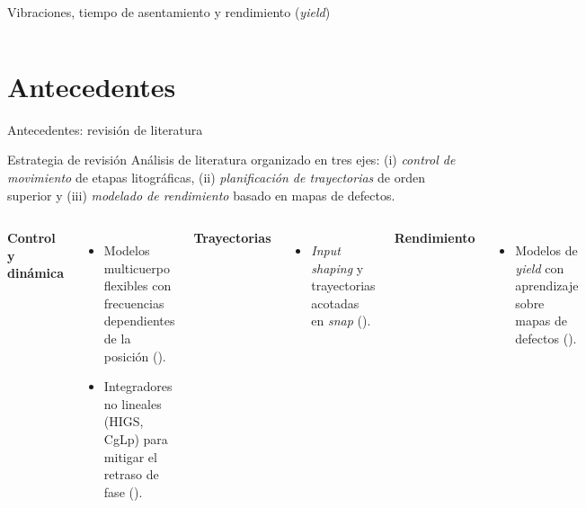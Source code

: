 \documentclass[en,16:9,navbarinline,bigfoot]{sdqbeamer}
\begin{document}
\begin{frame}{Vibraciones, tiempo de asentamiento y rendimiento (\textit{yield})}
\begin{columns}
    \end{columns}
\end{frame}

\section{Antecedentes}

\begin{frame}{Antecedentes: revisión de literatura}
    \begin{purpleblock}{Estrategia de revisión}
        Análisis de literatura organizado en tres ejes: (i) \emph{control de movimiento} de etapas litográficas, (ii) \emph{planificación de trayectorias} de orden superior y (iii) \emph{modelado de rendimiento} basado en mapas de defectos.
    \end{purpleblock}
    \vspace{0.2cm}
    \begin{columns}
        \textbf{Control y dinámica}
        \begin{itemize}
            \item Modelos multicuerpo flexibles con frecuencias dependientes de la posición (\cite{Al-Rawashdeh2022_Caracterization}).
            \item Integradores no lineales (HIGS, CgLp) para mitigar el retraso de fase (\cite{Heertjes2025_NonlinearControl}).
        \end{itemize}
        \textbf{Trayectorias}
        \begin{itemize}
            \item \textit{Input shaping} y trayectorias acotadas en \textit{snap} (\cite{Lambrechts2003_Trajectories,Al-Rawashdeh2023_Trajectories,Dong2023_SCurve}).
        \end{itemize}
        \textbf{Rendimiento}
        \begin{itemize}
            \item Modelos de \textit{yield} con aprendizaje sobre mapas de defectos (\cite{Kim2019_Productivity,Yang2018_Yield,Wu2015_WM811K}).
        \end{itemize}
    \end{columns}
\end{frame}
\end{document}
